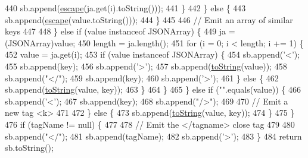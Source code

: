 \begin{DoxyCode}
440                             sb.append(\hyperlink{classorg_1_1json_1_1_x_m_l_ac7d1541b807c9c09526495fa16ab0d75}{escape}(ja.get(i).toString()));
441                         \}
442                     \} \textcolor{keywordflow}{else} \{
443                         sb.append(\hyperlink{classorg_1_1json_1_1_x_m_l_ac7d1541b807c9c09526495fa16ab0d75}{escape}(value.toString()));
444                     \}
445 
446 \textcolor{comment}{// Emit an array of similar keys}
447 
448                 \} \textcolor{keywordflow}{else} \textcolor{keywordflow}{if} (value instanceof JSONArray) \{
449                     ja = (JSONArray)value;
450                     length = ja.length();
451                     \textcolor{keywordflow}{for} (i = 0; i < length; i += 1) \{
452                         value = ja.get(i);
453                         \textcolor{keywordflow}{if} (value instanceof JSONArray) \{
454                             sb.append(\textcolor{charliteral}{'<'});
455                             sb.append(key);
456                             sb.append(\textcolor{charliteral}{'>'});
457                             sb.append(\hyperlink{classorg_1_1json_1_1_x_m_l_a4d4cd79a68a991f50707b87a7a23d02b}{toString}(value));
458                             sb.append(\textcolor{stringliteral}{"</"});
459                             sb.append(key);
460                             sb.append(\textcolor{charliteral}{'>'});
461                         \} \textcolor{keywordflow}{else} \{
462                             sb.append(\hyperlink{classorg_1_1json_1_1_x_m_l_a4d4cd79a68a991f50707b87a7a23d02b}{toString}(value, key));
463                         \}
464                     \}
465                 \} \textcolor{keywordflow}{else} \textcolor{keywordflow}{if} (\textcolor{stringliteral}{""}.equals(value)) \{
466                     sb.append(\textcolor{charliteral}{'<'});
467                     sb.append(key);
468                     sb.append(\textcolor{stringliteral}{"/>"});
469 
470 \textcolor{comment}{// Emit a new tag <k>}
471 
472                 \} \textcolor{keywordflow}{else} \{
473                     sb.append(\hyperlink{classorg_1_1json_1_1_x_m_l_a4d4cd79a68a991f50707b87a7a23d02b}{toString}(value, key));
474                 \}
475             \}
476             \textcolor{keywordflow}{if} (tagName != null) \{
477 
478 \textcolor{comment}{// Emit the </tagname> close tag}
479 
480                 sb.append(\textcolor{stringliteral}{"</"});
481                 sb.append(tagName);
482                 sb.append(\textcolor{charliteral}{'>'});
483             \}
484             \textcolor{keywordflow}{return} sb.toString();

\end{DoxyCode}
